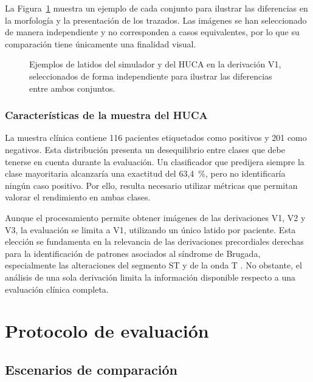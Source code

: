 La Figura~\ref{fig:synthetic_real_comparison} muestra un ejemplo de cada conjunto para ilustrar las diferencias en la morfología y la presentación de los trazados. Las imágenes se han seleccionado de manera independiente y no corresponden a casos equivalentes, por lo que su comparación tiene únicamente una finalidad visual.

\begin{figure}[H]
  \centering
  \caption{Ejemplos de latidos del simulador y del HUCA en la derivación V1, seleccionados de forma independiente para ilustrar las diferencias entre ambos conjuntos.}
  \label{fig:synthetic_real_comparison}
\end{figure}

\subsubsection{Características de la muestra del HUCA}
\label{sec:procedencia_huca}

La muestra clínica contiene 116 pacientes etiquetados como positivos y 201 como negativos. Esta distribución presenta un desequilibrio entre clases que debe tenerse en cuenta durante la evaluación. Un clasificador que predijera siempre la clase mayoritaria alcanzaría una exactitud del 63,4~\%, pero no identificaría ningún caso positivo. Por ello, resulta necesario utilizar métricas que permitan valorar el rendimiento en ambas clases.

Aunque el procesamiento permite obtener imágenes de las derivaciones V1, V2 y V3, la evaluación se limita a V1, utilizando un único latido por paciente. Esta elección se fundamenta en la relevancia de las derivaciones precordiales derechas para la identificación de patrones asociados al síndrome de Brugada, especialmente las alteraciones del segmento ST y de la onda T \cite{zeppenfeld2022}. No obstante, el análisis de una sola derivación limita la información disponible respecto a una evaluación clínica completa.



\section{Protocolo de evaluación}

\subsection{Escenarios de comparación}
\label{sec:escenarios}

